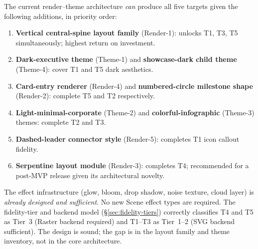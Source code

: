 The current render--theme architecture \emph{can} produce all five targets given the
following additions, in priority order:

\begin{enumerate}
  \item \textbf{Vertical central-spine layout family} (Render-1): unlocks T1, T3, T5
        simultaneously; highest return on investment.
  \item \textbf{Dark-executive theme} (Theme-1) and \textbf{showcase-dark child theme}
        (Theme-4): cover T1 and T5 dark aesthetics.
  \item \textbf{Card-entry renderer} (Render-4) and \textbf{numbered-circle milestone
        shape} (Render-2): complete T5 and T2 respectively.
  \item \textbf{Light-minimal-corporate} (Theme-2) and
        \textbf{colorful-infographic} (Theme-3) themes: complete T2 and T3.
  \item \textbf{Dashed-leader connector style} (Render-5): completes T1 icon callout
        fidelity.
  \item \textbf{Serpentine layout module} (Render-3): completes T4; recommended for
        a post-MVP release given its architectural novelty.
\end{enumerate}

The effect infrastructure (glow, bloom, drop shadow, noise texture, cloud layer) is
\emph{already designed and sufficient}. No new Scene effect types are required.
The fidelity-tier and backend model (\S\ref{sec:fidelity-tiers}) correctly classifies
T4 and T5 as Tier~3 (Raster backend required) and T1--T3 as Tier~1--2 (SVG backend
sufficient). The design is sound; the gap is in the layout family and theme inventory,
not in the core architecture.
